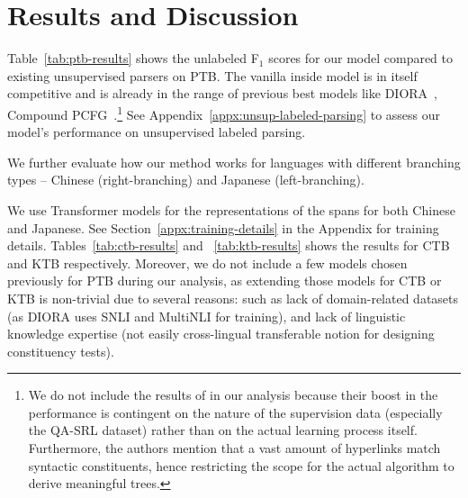 \documentclass[11pt]{article}
\newcommand{\ptb}{\textsc{PTB}}
\newcommand{\ctb}{\textsc{CTB}}
\newcommand{\ktb}{\textsc{KTB}}
\newcommand{\ignore}[1]{}
\begin{document}
 \section{Results and Discussion}
\label{sec:results}

Table~\ref{tab:ptb-results} shows the unlabeled F$_1$ scores for our model compared to existing unsupervised parsers on \ptb{}. The vanilla inside model is in itself competitive and is already in the range of previous best models like DIORA~\citep{drozdov-etal-2019-unsupervised}, Compound PCFG~\citep{kim-etal-2019-compound}.\footnote{We do not include the results of \citet{shi-etal-2021-learning} in our analysis because their boost in the performance is contingent on the nature of the supervision data (especially the QA-SRL dataset) rather than on the actual learning process itself. Furthermore, the authors mention that a vast amount of hyperlinks match syntactic constituents, hence restricting the scope for the actual algorithm to derive meaningful trees.} See Appendix~\ref{appx:unsup-labeled-parsing} to assess our model's performance on unsupervised labeled parsing.

We further evaluate how our method works for languages with different branching types -- Chinese (right-branching) and Japanese (left-branching).
\ignore{
The issue with multilingual \textsc{BERT} (\textsc{mBERT}; \citealp{devlin-etal-2019-bert}) as well as with \textsc{XLM-RoBERTa} \citep{conneau-etal-2020-unsupervised} is that those produce rather bad sentence representation out-of-the-box. Further, the vector spaces between languages are not aligned, i.e., the sentences with the same content in different languages would be mapped to different locations in the vector space. Given that we were more easily able to achieve good results with monolingual Transformer models, and knowing that it requires less memory (due to a smaller vocabulary), we decided to stick with it (see Section~\ref{appx:training-details} in Appendix for training details).
}
We use Transformer models for the representations of the spans for both Chinese and Japanese. See Section~\ref{appx:training-details} in the Appendix for training details. Tables~\ref{tab:ctb-results} and ~\ref{tab:ktb-results} shows the results for \ctb{} and \ktb{} respectively. Moreover, we do not include a few models chosen previously for \ptb{} during our analysis, as extending those models for \ctb{} or \ktb{} is non-trivial due to several reasons: such as lack of domain-related datasets (as {DIORA} uses SNLI and MultiNLI for training), and lack of linguistic knowledge expertise (not easily cross-lingual transferable notion for designing constituency tests).  
\end{document}

